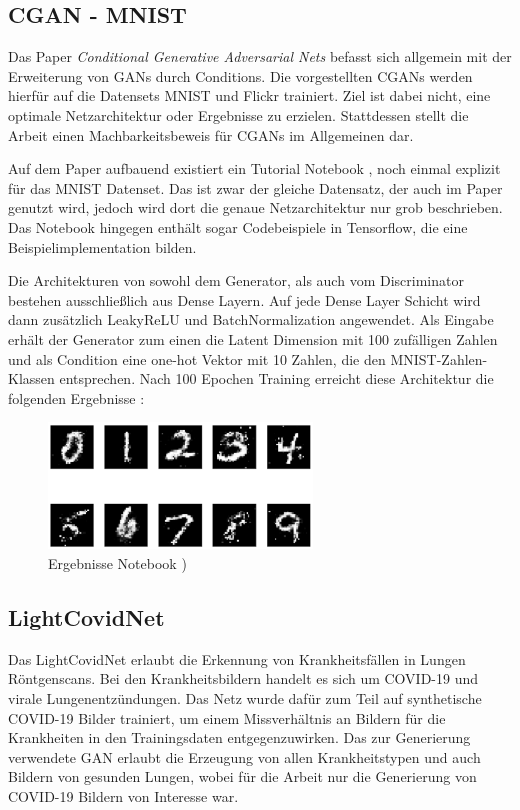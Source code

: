 \subsection{CGAN - MNIST}
Das Paper \textit{Conditional Generative Adversarial Nets} \cite{mirza2014conditional} befasst sich allgemein mit der Erweiterung von GANs durch Conditions. 
Die vorgestellten CGANs werden hierfür auf die Datensets MNIST und Flickr trainiert.
Ziel ist dabei nicht, eine optimale Netzarchitektur oder Ergebnisse zu erzielen.
Stattdessen stellt die Arbeit einen Machbarkeitsbeweis für CGANs im Allgemeinen dar.
\newline

Auf dem Paper aufbauend existiert ein Tutorial Notebook \cite{cgan-tutorial-notebook}, noch einmal explizit für das MNIST Datenset.
Das ist zwar der gleiche Datensatz, der auch im Paper genutzt wird, jedoch wird dort die genaue Netzarchitektur nur grob beschrieben.
Das Notebook hingegen enthält sogar Codebeispiele in Tensorflow, die eine Beispielimplementation bilden.
\newline

Die Architekturen von sowohl dem Generator, als auch vom Discriminator bestehen ausschließlich aus Dense Layern.
Auf jede Dense Layer Schicht wird dann zusätzlich LeakyReLU und BatchNormalization angewendet.
Als Eingabe erhält der Generator zum einen die Latent Dimension mit 100 zufälligen Zahlen und als Condition eine one-hot Vektor mit 10 Zahlen, die den MNIST-Zahlen-Klassen entsprechen.
Nach 100 Epochen Training erreicht diese Architektur die folgenden Ergebnisse :

\begin{figure}[H]
	\centering
	\includegraphics[width=7cm]{kapitel/2_stand_der_technik/img/cgan-notebook-ergebnisse.png}
	\caption{Ergebnisse Notebook \cite{cgan-tutorial-notebook}) }
\end{figure}

\subsection{LightCovidNet}
Das LightCovidNet \cite{inspiration-dc-gan-med} erlaubt die Erkennung von Krankheitsfällen in Lungen Röntgenscans.
Bei den Krankheitsbildern handelt es sich um COVID-19 und virale Lungenentzündungen.
Das Netz wurde dafür zum Teil auf synthetische COVID-19 Bilder trainiert, um einem Missverhältnis an Bildern für die Krankheiten in den Trainingsdaten entgegenzuwirken.
Das zur Generierung verwendete GAN erlaubt die Erzeugung von allen Krankheitstypen und auch Bildern von gesunden Lungen, wobei für die Arbeit nur die Generierung von COVID-19 Bildern von Interesse war.
\newline

